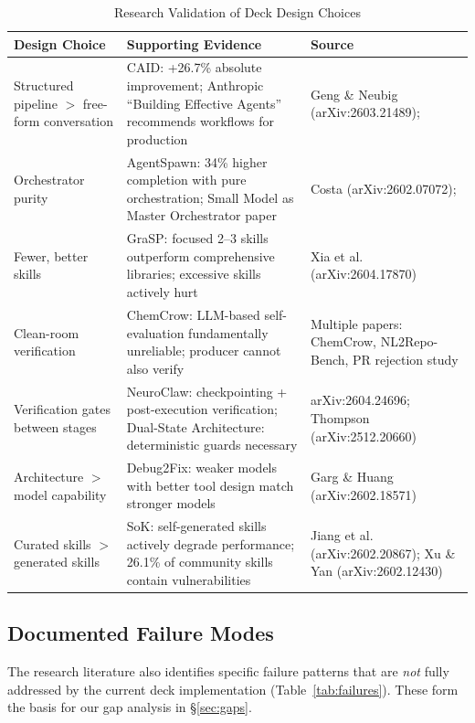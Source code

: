 \documentclass[11pt,a4paper]{article}
\begin{document}
\begin{table}[htbp]
\centering
\caption{Research Validation of Deck Design Choices}
\label{tab:validation}
\small
\begin{tabular}{@{}p{3.5cm}p{5cm}p{5cm}@{}}
\toprule
\textbf{Design Choice} & \textbf{Supporting Evidence} & \textbf{Source} \\
\midrule
Structured pipeline $>$ free-form conversation
  & CAID: +26.7\% absolute improvement; Anthropic ``Building Effective Agents'' recommends workflows for production
  & Geng \& Neubig (arXiv:2603.21489); \cite{anthropic2024agents} \\
\midrule
Orchestrator purity
  & AgentSpawn: 34\% higher completion with pure orchestration; Small Model as Master Orchestrator paper
  & Costa (arXiv:2602.07072); \cite{smallorchestrator2026} \\
\midrule
Fewer, better skills
  & GraSP: focused 2--3 skills outperform comprehensive libraries; excessive skills actively hurt
  & Xia et al. (arXiv:2604.17870) \\
\midrule
Clean-room verification
  & ChemCrow: LLM-based self-evaluation fundamentally unreliable; producer cannot also verify
  & Multiple papers: ChemCrow, NL2Repo-Bench, PR rejection study \\
\midrule
Verification gates between stages
  & NeuroClaw: checkpointing + post-execution verification; Dual-State Architecture: deterministic guards necessary
  & arXiv:2604.24696; Thompson (arXiv:2512.20660) \\
\midrule
Architecture $>$ model capability
  & Debug2Fix: weaker models with better tool design match stronger models
  & Garg \& Huang (arXiv:2602.18571) \\
\midrule
Curated skills $>$ generated skills
  & SoK: self-generated skills actively degrade performance; 26.1\% of community skills contain vulnerabilities
  & Jiang et al. (arXiv:2602.20867); Xu \& Yan (arXiv:2602.12430) \\
\bottomrule
\end{tabular}
\end{table}

\subsection{Documented Failure Modes}

The research literature also identifies specific failure patterns that are \emph{not} fully addressed by the current deck implementation (Table~\ref{tab:failures}).  These form the basis for our gap analysis in \S\ref{sec:gaps}.
\end{document}
